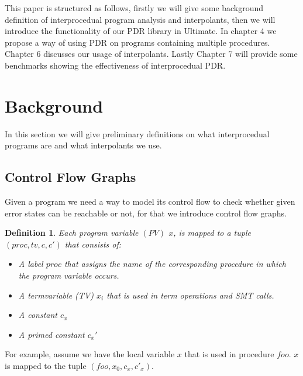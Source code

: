 \documentclass{article}
\newtheorem{mydef}{Definition}
\begin{document}
    This paper is structured as follows, firstly we will give some background definition of interprocedual program analysis and interpolants, then we will introduce the functionality of our PDR library in Ultimate. In chapter 4 we propose a way of using PDR on programs containing multiple procedures. Chapter 6 discusses our usage of interpolants. Lastly Chapter 7 will provide some benchmarks showing the effectiveness of interprocedual PDR.
    
    \pagebreak
	
	\section{Background}
	In this section we will give preliminary definitions on what interprocedual programs are and what interpolants we use.
	
    
    \newcommand{\tf}{\ensuremath{\varphi}\xspace}
    \newcommand{\ctf}{\ensuremath{\widehat{\varphi}}\xspace}
    \newcommand{\invars}{\ensuremath{In}\xspace}
    \newcommand{\outvars}{\ensuremath{Out}\xspace}
    \newcommand{\auxvars}{\ensuremath{Aux}\xspace}
	
	\subsection{Control Flow Graphs}	
	Given a program we need a way to model its control flow to check whether given error states can be reachable or not, for that we introduce control flow graphs.
	
	\begin{mydef}
	Each program variable $(PV)$ $x$, is mapped to a tuple $(proc, tv, c, c')$ that consists of: 
		\begin{itemize}
			\item A label $proc$ that assigns the name of the corresponding procedure in which the program variable occurs. 
			\item A termvariable (TV) $x_i$ that is used in term operations and SMT calls.
			\item A constant $c_x$
			\item A primed constant $c_x'$
		\end{itemize}
	\end{mydef}
	For example, assume we have the local variable $x$ that is used in procedure $foo$. $x$ is mapped to the tuple $(foo, x_0, c_x, c'_x)$. 
	
\end{document}
